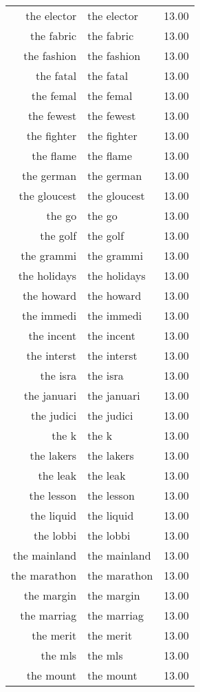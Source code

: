 \begin{table}[ht]
\begin{tabular}{rlr}
  the elector & the elector & 13.00 \\ 
  the fabric & the fabric & 13.00 \\ 
  the fashion & the fashion & 13.00 \\ 
  the fatal & the fatal & 13.00 \\ 
  the femal & the femal & 13.00 \\ 
  the fewest & the fewest & 13.00 \\ 
  the fighter & the fighter & 13.00 \\ 
  the flame & the flame & 13.00 \\ 
  the german & the german & 13.00 \\ 
  the gloucest & the gloucest & 13.00 \\ 
  the go & the go & 13.00 \\ 
  the golf & the golf & 13.00 \\ 
  the grammi & the grammi & 13.00 \\ 
  the holidays & the holidays & 13.00 \\ 
  the howard & the howard & 13.00 \\ 
  the immedi & the immedi & 13.00 \\ 
  the incent & the incent & 13.00 \\ 
  the interst & the interst & 13.00 \\ 
  the isra & the isra & 13.00 \\ 
  the januari & the januari & 13.00 \\ 
  the judici & the judici & 13.00 \\ 
  the k & the k & 13.00 \\ 
  the lakers & the lakers & 13.00 \\ 
  the leak & the leak & 13.00 \\ 
  the lesson & the lesson & 13.00 \\ 
  the liquid & the liquid & 13.00 \\ 
  the lobbi & the lobbi & 13.00 \\ 
  the mainland & the mainland & 13.00 \\ 
  the marathon & the marathon & 13.00 \\ 
  the margin & the margin & 13.00 \\ 
  the marriag & the marriag & 13.00 \\ 
  the merit & the merit & 13.00 \\ 
  the mls & the mls & 13.00 \\ 
  the mount & the mount & 13.00 \\ 

\end{tabular}
\end{table}
